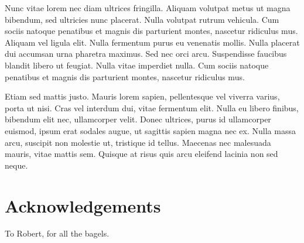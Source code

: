 Nunc vitae lorem nec diam ultrices fringilla. Aliquam volutpat metus ut magna bibendum, sed ultricies nunc placerat. Nulla volutpat rutrum vehicula. Cum sociis natoque penatibus et magnis dis parturient montes, nascetur ridiculus mus. Aliquam vel ligula elit. Nulla fermentum purus eu venenatis mollis. Nulla placerat dui accumsan urna pharetra maximus. Sed nec orci arcu. Suspendisse faucibus blandit libero ut feugiat. Nulla vitae imperdiet nulla. Cum sociis natoque penatibus et magnis dis parturient montes, nascetur ridiculus mus.

Etiam sed mattis justo. Mauris lorem sapien, pellentesque vel viverra varius, porta ut nisi. Cras vel interdum dui, vitae fermentum elit. Nulla eu libero finibus, bibendum elit nec, ullamcorper velit. Donec ultrices, purus id ullamcorper euismod, ipsum erat sodales augue, ut sagittis sapien magna nec ex. Nulla massa arcu, suscipit non molestie ut, tristique id tellus. Maecenas nec malesuada mauris, vitae mattis sem. Quisque at risus quis arcu eleifend lacinia non sed neque.

\section*{Acknowledgements}

To Robert, for all the bagels.
